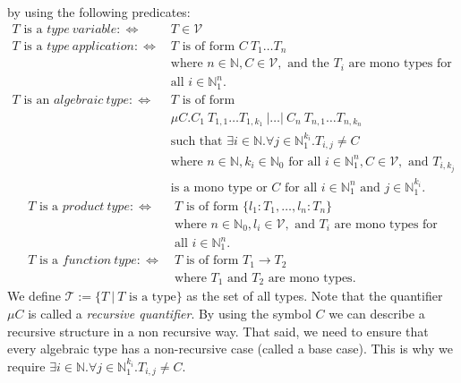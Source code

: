 \documentclass[]{scrbook}
\theoremstyle{definition}
\theoremstyle{definition}
\theoremstyle{definition}
\theoremstyle{remark}
\begin{document}
by using the following predicates: \[
\begin{aligned}
T \text{ is a } \mathit{type} \ \mathit{variable}:\Leftrightarrow \ & T \in\mathcal{V}\\
T \text{ is a } \mathit{type} \ \mathit{application}:\Leftrightarrow \
         & T \text{ is of form } C \ T_1 \dots T_n\\
         & \text{where } n\in\mathbb{N}, C\in\mathcal{V}, \text{ and the } T_i \text{ are mono types for}\\
         & \text{all } i\in\mathbb{N}_1^n.\\
T \text{ is an } \mathit{algebraic} \ \mathit{type}:\Leftrightarrow \
         & T \text{ is of form }\\
         & \mu C. C_1 \ T_{1,1} \dots T_{1,k_1} \ | \dots | \ C_n \ T_{n,1} \dots T_{n,k_n}\\
         & \text{such that }\exists i\in\mathbb{N}.\forall j\in\mathbb{N}_1^{k_i}.T_{i,j}\neq C\\
         & \text{where } n\in\mathbb{N},k_i\in\mathbb{N}_0 \text{ for all } i\in\mathbb{N}_1^n, C\in\mathcal{V}, \text{ and } T_{i,k_j}\\
         & \text{is a mono type or } C \text{ for all } i\in\mathbb{N}_1^n \text{ and } j\in\mathbb{N}_1^{k_i}.
\end{aligned}
\] \[
\begin{aligned}
T \text{ is a } \mathit{product} \ \mathit{type}:\Leftrightarrow \
         & T \text{ is of form } \{l_1:T_1,\dots,l_n:T_n\}\\
         & \text{where }n\in\mathbb{N}_0, l_i\in\mathcal{V}, \text{ and } T_i \text{ are mono types for}\\
         & \text{all } i\in\mathbb{N}_1^n.\\
T \text{ is a } \mathit{function} \ \mathit{type}:\Leftrightarrow \
         & T \text{ is of form } T_1 \to T_2\\
         & \text{where } T_1 \text{ and } T_2 \text{ are mono types}.
\end{aligned}
\] We define \(\mathcal{T} := \{T \ | \ T \text{ is a type}\}\) as the
set of all types.
\EndKnitrBlock{definition} Note that the quantifier \(\mu C\) is called
a \emph{recursive quantifier}. By using the symbol \(C\) we can describe
a recursive structure in a non recursive way. That said, we need to
ensure that every algebraic type has a non-recursive case (called a base
case). This is why we require
\(\exists i\in\mathbb{N}.\forall j\in\mathbb{N}_1^{k_i}.T_{i,j}\neq C\).
\end{document}
